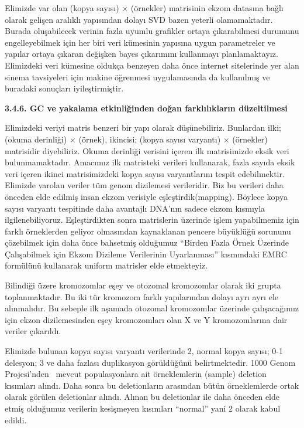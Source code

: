 \documentclass[11pt]{article}
\begin{document}
Elimizde var olan (kopya sayısı) $\times$ (örnekler) matrisinin  ekzom datasına bağlı olarak gelişen aralıklı yapısından dolayı SVD bazen yeterli olamamaktadır. Burada oluşabilecek verinin fazla uyumlu grafikler ortaya çıkarabilmesi durumunu engelleyebilmek için her biri veri kümesinin yapısına uygun parametreler ve yapılar ortaya çıkaran değişken bayes çıkarımını kullanmayı planlamaktayız. Elimizdeki veri kümesine oldukça benzeyen daha önce internet sitelerinde yer alan sinema tavsiyeleri için makine öğrenmesi uygulamasında da kullanılmış ve buradaki sonuçları iyileştirmiştir.

{\bf 3.4.6. GC ve yakalama etkinliğinden doğan farklılıkların düzeltilmesi}

Elimizdeki veriyi matris benzeri bir yapı olarak düşünebiliriz. Bunlardan ilki; (okuma derinliği) $\times$ (örnek), ikincisi; (kopya sayısı varyantı) $\times$ (örnekler) matrisidir  diyebiliriz. Okuma derinliği verisini içeren ilk matrisimizde eksik veri bulunmamaktadır. Amacımız ilk matristeki verileri kullanarak, fazla sayıda eksik veri içeren ikinci matrisimizdeki kopya sayısı varyantlarını tespit edebilmektir. Elimizde varolan veriler tüm genom dizilemesi verileridir. Biz bu verileri daha önceden elde edilmiş insan ekzom verisiyle eşleştirdik(mapping). Böylece kopya sayısı varyantı tespitinde daha avantajlı DNA'nın sadece ekzom kısmıyla ilgilenebiliyoruz. Eşleştirdikten sonra matrislerin üzerinde işlem yapabilmemiz için farklı örneklerden  geliyor olmasından kaynaklanan pencere büyüklüğü sorununu çözebilmek için daha önce bahsetmiş olduğumuz ``Birden Fazla Örnek Üzerinde Çalışabilmek için Ekzom Dizileme Verilerinin Uyarlanması'' kısmındaki EMRC formülünü kullanarak uniform matrisler elde etmekteyiz.

Bilindiği üzere kromozomlar eşey ve otozomal kromozomlar olarak iki grupta toplanmaktadır. Bu iki tür kromozom farklı yapılarından dolayı ayrı ayrı ele alınmalıdır. Bu sebeple ilk aşamada otozomal kromozomlar üzerinde çalışacağımız için ekzon dizilemesinden eşey kromozomları olan X ve Y kromozomlarına dair veriler çıkarıldı. 

Elimizde bulunan kopya sayısı varyantı verilerinde 2, normal kopya sayısı; 0-1 delesyon; 3 ve daha fazlası duplikasyon görüldüğünü belirtmektedir. 1000 Genom Projesi'nden~\cite{1000GP2012} mevcut populasyonlara ait örneklemlerin (sample) deletion kısımları alındı. Daha sonra bu deletionların arasından bütün örneklemlerde ortak olarak görülen deletionlar alındı. Alınan bu deletionlar ile daha önceden elde etmiş olduğumuz verilerin kesişmeyen kısımları ``normal'' yani 2 olarak kabul edildi.
\end{document}

